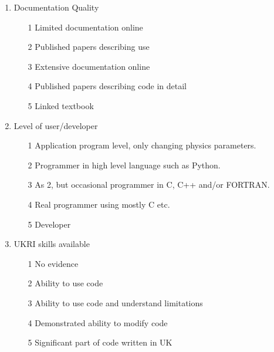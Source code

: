 \begin{enumerate}
\item Documentation Quality
\begin{itemize}
\item[1] Limited documentation online
\item[2] Published papers describing use
\item[3] Extensive documentation online
\item[4] Published papers describing code in detail
\item[5] Linked textbook
\end{itemize}

\item Level of user/developer
\begin{itemize}
\item[1] Application program level, only changing physics parameters.
\item[2] Programmer in high level language such as Python.
\item[3] As 2, but occasional programmer in C, C++ and/or FORTRAN.
\item[4] Real programmer using mostly C etc.
\item[5] Developer
\end{itemize}

\item UKRI skills available
\begin{itemize}
\item[1] No evidence
\item[2] Ability to use code
\item[3] Ability to use code and understand limitations
\item[4] Demonstrated ability to modify code
\item[5] Significant part of code written in UK
\end{itemize}

\end{enumerate}

